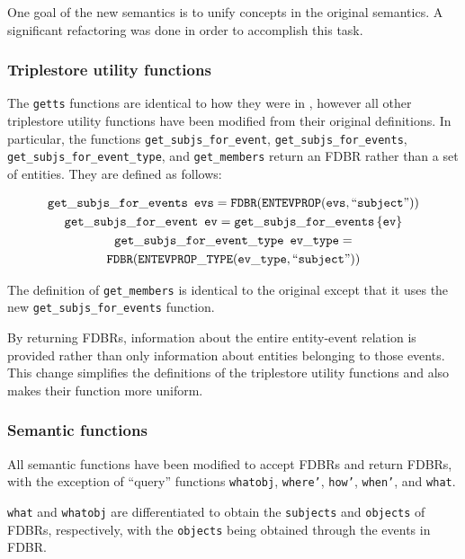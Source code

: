 \documentclass[../main.tex]{subfiles}
\begin{document}
One goal of the new semantics is to unify concepts in the original semantics.  A significant refactoring was done in order to 
accomplish this task.

\subsubsection{Triplestore utility functions}

The \texttt{getts} functions are identical to how they were in \cite{frost2013event}, however
all other triplestore utility functions have been modified from their original definitions.
In particular, the functions \texttt{get\_subjs\_for\_event}, \texttt{get\_subjs\_for\_events},
\texttt{get\_subjs\_for\_event\_type}, and \texttt{get\_members} return an FDBR rather than a set of entities.  They are defined as follows:

\begin{multline*}
  \mathtt{get\_subjs\_for\_events}\enspace \mathtt{evs} = \mathtt{FDBR}(\mathtt{ENTEVPROP}(\mathtt{evs}, \text{``\texttt{subject}''})) \\
  \mathtt{get\_subjs\_for\_event}\enspace \mathtt{ev} = \mathtt{get\_subjs\_for\_events}\left\{\mathtt{ev}\right\} \\
  \mathtt{get\_subjs\_for\_event\_type}\enspace \mathtt{ev\_type} =\\ \mathtt{FDBR}(\mathtt{ENTEVPROP\_TYPE}(\mathtt{ev\_type}, \text{``\texttt{subject}''}))
\end{multline*}

The definition of \texttt{get\_members} is identical to the original except that it uses the new \texttt{get\_subjs\_for\_events} function.

By returning FDBRs, information about the entire entity-event relation is provided rather than only information about entities
belonging to those events.  This change simplifies the definitions of the triplestore utility functions and also makes their function
more uniform.


\subsubsection{Semantic functions}

All semantic functions have been modified to accept FDBRs and return FDBRs, with the exception of ``query'' functions
\texttt{whatobj}, \texttt{where'}, \texttt{how'}, \texttt{when'}, and \texttt{what}.

\texttt{what} and \texttt{whatobj} are differentiated to obtain the \texttt{subjects} and \texttt{objects} of FDBRs, respectively, with the
\texttt{objects} being obtained through the events in FDBR. 
\end{document}
